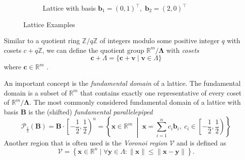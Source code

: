 \begin{figure}
\begin{subfigure}{0.5\textwidth}
        \caption{Lattice with basis $\mathbf{b}_1 = (0, 1)^\intercal,\; \mathbf{b}_2 = (2, 0)^\intercal$}
        \label{fig:lattice-b}
    \end{subfigure}
    \caption{Lattice Examples}\label{fig:lattice}
\end{figure}


Similar to a quotient ring $\mathbb{Z}/q\mathbb{Z}$ of integers modulo some positive integer $q$ with cosets $c + q\mathbb{Z}$, we can define the quotient group $\mathbb{R}^m/\mathbf{\Lambda}$ with \textit{cosets}
\begin{equation}
    \mathbf{c} + \Lambda = \{\mathbf{c} + \mathbf{v} \mid \mathbf{v}\in \Lambda\}
\end{equation}
where $\mathbf{c} \in \mathbb{R}^m$ \cite{Pei16}. %

An important concept is the \textit{fundamental domain} of a lattice. The fundamental domain is a subset of $\mathbb{R}^m$ that contains exactly one representative of every coset of $\mathbb{R}^m/\mathbf{\Lambda}$. The most commonly considered fundamental domain of a lattice with basis $\mathbf{B}$ is the (shifted) \textit{fundamental parallelepiped}
\begin{equation} \label{eq:fundamental-parallelepiped}
    \mathcal{P}_{\frac{1}{2}}(\mathbf{B}) = \mathbf{B} \cdot \left[ - \frac{1}{2}, \frac{1}{2}\right)^n = \left\{ \mathbf{x} \in \mathbb{R}^m \;\middle|\; \mathbf{x} = \sum_{i=1}^n c_i \mathbf{b}_i, \; c_i \in  \left[ - \frac{1}{2}, \frac{1}{2}\right) \right\}
\end{equation}
Another region that is often used is the \textit{Voronoi region} $\mathcal{V}$ \cite{GJS15} and is defined as
\begin{equation}\label{eq:voronoi-region}
    \mathcal{V} = \left\{ \mathbf{x} \in \mathbb{R}^n \mid \forall \mathbf{y} \in \Lambda : \| \mathbf{x} \| \leq \| \mathbf{x} - \mathbf{y} \| \right\}.
\end{equation}

